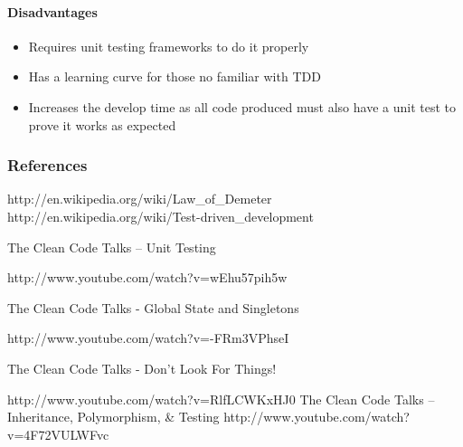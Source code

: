 \paragraph*{Disadvantages}
\begin{itemize}
\item Requires unit testing frameworks to do it properly
\item Has a learning curve for those no familiar with TDD
\item Increases the develop time as all code produced must also have a unit
test to prove it works as expected
\end{itemize}

\subsubsection*{References}

http://en.wikipedia.org/wiki/Law\_of\_Demeter http://en.wikipedia.org/wiki/Test-driven\_development 

\textquotedbl{}The Clean Code Talks -- Unit Testing\textquotedbl{} 

http://www.youtube.com/watch?v=wEhu57pih5w

The Clean Code Talks - \textquotedbl{}Global State and Singletons\textquotedbl{}

http://www.youtube.com/watch?v=-FRm3VPhseI 

The Clean Code Talks - Don't Look For Things!

http://www.youtube.com/watch?v=RlfLCWKxHJ0 \textquotedbl{}The Clean
Code Talks -- Inheritance, Polymorphism, \& Testing\textquotedbl{}
http://www.youtube.com/watch?v=4F72VULWFvc
